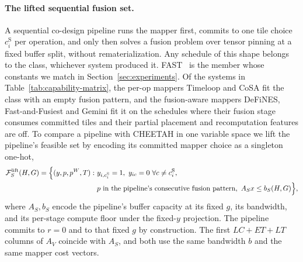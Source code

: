 \paragraph{The lifted sequential fusion set.}
A sequential co-design pipeline runs the mapper first, commits to one tile choice $c^{\mathrm{S}}_i$ per operation, and only then solves a fusion problem over tensor pinning at a fixed buffer split, without rematerialization.
Any schedule of this shape belongs to the class, whichever system produced it.
FAST~\citep{zhang_fast} is the member whose constants we match in Section~\ref{sec:experiments}.
Of the systems in Table~\ref{tab:capability-matrix}, the per-op mappers Timeloop and CoSA fit the class with an empty fusion pattern, and the fusion-aware mappers DeFiNES, Fast-and-Fusiest and Gemini fit it on the schedules where their fusion stage consumes committed tiles and their partial placement and recomputation features are off.
To compare a pipeline with CHEETAH in one variable space we lift the pipeline's feasible set by encoding its committed mapper choice as a singleton one-hot,
\begin{equation}
\begin{aligned}
\mathcal F^{\mathrm{lift}}_S(H,G)=\Bigl\{(y,p,p^W,T):\ &
y_{i,c^{\mathrm{S}}_i}=1,\ y_{ic}=0\ \forall c\ne c^{\mathrm{S}}_i,\\
&\text{$p$ in the pipeline's consecutive fusion pattern},\ A_Sx\le b_S(H,G)\Bigr\},
\end{aligned}
\label{eq:fflift}
\end{equation}
where $A_S,b_S$ encode the pipeline's buffer capacity at its fixed $g$, its bandwidth, and its per-stage compute floor under the fixed-$y$ projection.
The pipeline commits to $r=0$ and to that fixed $g$ by construction.
The first $LC+ET+LT$ columns of $A_V$ coincide with $A_S$, and both use the same bandwidth $b$ and the same mapper cost vectors.

